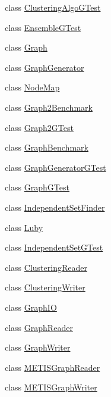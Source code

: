 \begin{DoxyCompactItemize}
class \hyperlink{class_ensemble_clustering_1_1_clustering_algo_g_test}{Clustering\-Algo\-G\-Test}
\item 
class \hyperlink{class_ensemble_clustering_1_1_ensemble_g_test}{Ensemble\-G\-Test}
\item 
class \hyperlink{class_ensemble_clustering_1_1_graph}{Graph}
\item 
class \hyperlink{class_ensemble_clustering_1_1_graph_generator}{Graph\-Generator}
\item 
class \hyperlink{class_ensemble_clustering_1_1_node_map}{Node\-Map}
\item 
class \hyperlink{class_ensemble_clustering_1_1_graph2_benchmark}{Graph2\-Benchmark}
\item 
class \hyperlink{class_ensemble_clustering_1_1_graph2_g_test}{Graph2\-G\-Test}
\item 
class \hyperlink{class_ensemble_clustering_1_1_graph_benchmark}{Graph\-Benchmark}
\item 
class \hyperlink{class_ensemble_clustering_1_1_graph_generator_g_test}{Graph\-Generator\-G\-Test}
\item 
class \hyperlink{class_ensemble_clustering_1_1_graph_g_test}{Graph\-G\-Test}
\item 
class \hyperlink{class_ensemble_clustering_1_1_independent_set_finder}{Independent\-Set\-Finder}
\item 
class \hyperlink{class_ensemble_clustering_1_1_luby}{Luby}
\item 
class \hyperlink{class_ensemble_clustering_1_1_independent_set_g_test}{Independent\-Set\-G\-Test}
\item 
class \hyperlink{class_ensemble_clustering_1_1_clustering_reader}{Clustering\-Reader}
\item 
class \hyperlink{class_ensemble_clustering_1_1_clustering_writer}{Clustering\-Writer}
\item 
class \hyperlink{class_ensemble_clustering_1_1_graph_i_o}{Graph\-I\-O}
\item 
class \hyperlink{class_ensemble_clustering_1_1_graph_reader}{Graph\-Reader}
\item 
class \hyperlink{class_ensemble_clustering_1_1_graph_writer}{Graph\-Writer}
\item 
class \hyperlink{class_ensemble_clustering_1_1_m_e_t_i_s_graph_reader}{M\-E\-T\-I\-S\-Graph\-Reader}
\item 
class \hyperlink{class_ensemble_clustering_1_1_m_e_t_i_s_graph_writer}{M\-E\-T\-I\-S\-Graph\-Writer}
\item 

\end{DoxyCompactItemize}

